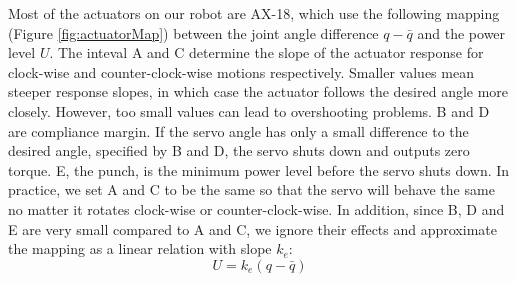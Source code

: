Most of the actuators on our robot are AX-18, which use the following mapping (Figure \ref{fig:actuatorMap}) between the joint angle difference $q-\bar{q}$ and the power level $U$. The inteval A and C determine the slope of the actuator response for clock-wise and counter-clock-wise motions respectively. Smaller values mean steeper response slopes, in which case the actuator follows the desired angle more closely. However, too small values can lead to overshooting problems. B and D are compliance margin. If the servo angle has only a small difference to the desired angle, specified by B and D, the servo shuts down and outputs zero torque. E, the punch, is the minimum power level before the servo shuts down. In practice, we set A and C to be the same so that the servo will behave the same no matter it rotates clock-wise or counter-clock-wise. In addition, since B, D and E are very small compared to A and C, we ignore their effects and approximate the mapping as a linear relation with slope $k_e$:
\begin{equation}
  U=k_e(q-\bar{q})
  \label{eqn:voltageErrorRelation}
\end{equation}

